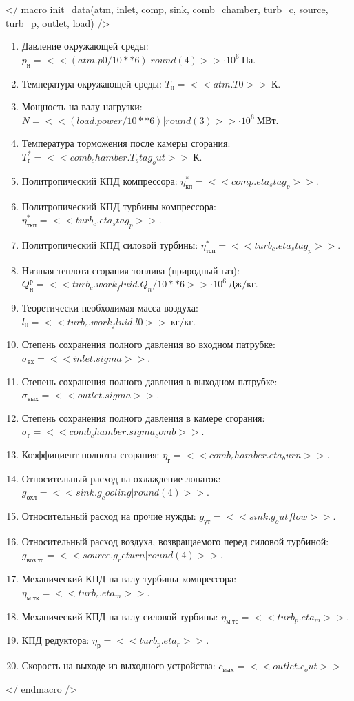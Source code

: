 ﻿\usepackage{amsmath}

</ macro init_data(atm, inlet, comp, sink, comb_chamber, turb_c, source, turb_p, outlet, load)  />
\begin{enumerate}

	\item Давление окружающей среды: $p_{н} = << (atm.p0 / 10**6)|round(4) >> \cdot 10^6\ Па$.
	\item Температура окружающей среды: $T_{н} = << atm.T0 >>\ К$.
	\item Мощность на валу нагрузки: $ N = << (load.power/ 10**6) | round(3) >> \cdot 10^6\ МВт $.
	\item Температура торможения после камеры сгорания: $T_г^* = << comb_chamber.T_stag_out >>\ К$.
	\item Политропический КПД компрессора: $\eta^*_{к п} = << comp.eta_stag_p >> $.
	\item Политропический КПД турбины компрессора: $\eta^*_{ткп} = << turb_c.eta_stag_p >>$.
	\item Политропический КПД силовой турбины: $\eta^*_{тсп} = << turb_c.eta_stag_p >>$.
	\item Низшая теплота сгорания топлива (природный газ): $Q^р_н = << turb_c.work_fluid.Q_n / 10**6>> \cdot 10^6\ Дж/кг$.
	\item Теоретически необходимая масса воздуха: $l_0 = << turb_c.work_fluid.l0 >>\ кг/кг$.

	\item Степень сохранения полного давления во входном патрубке: $\sigma_{вх} = << inlet.sigma >>$.
	\item Степень сохранения полного давления в выходном патрубке: $\sigma_{вых} = << outlet.sigma >>$.
	\item Степень сохранения полного давления в камере сгорания: $\sigma_г = << comb_chamber.sigma_comb >>$.
	\item Коэффициент полноты сгорания: $\eta_г = << comb_chamber.eta_burn >> $.
	\item Относительный расход на охлаждение лопаток: $g_{охл} = << sink.g_cooling | round(4) >>$.
	\item Относительный расход на прочие нужды: $g_{ут} = << sink.g_outflow >>$.
	\item Относительный расход воздуха, возвращаемого перед силовой турбиной: $g_{воз.тс} = << source.g_return |round(4) >>$.
	\item Механический КПД на валу турбины компрессора: $\eta_{м.тк} = << turb_c.eta_m >>$.
	\item Механический КПД на валу силовой турбины: $\eta_{м.тс} = << turb_p.eta_m >>$.
	\item КПД редуктора: $ \eta_р = << turb_p.eta_r >>$.
	\item Скорость на выходе из выходного устройства: $ c_{вых} = << outlet.c_out >> $

\end{enumerate}
</ endmacro />

